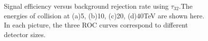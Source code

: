 \begin{figure}
\begin{center}
\end{center}
\caption{Signal efficiency versus background rejection rate using $\tau_{32}$.The energies of collision at (a)5, (b)10, (c)20, (d)40TeV are shown here. In each picture, the three ROC curves correspond to different detector sizes.}
\label{fig:cluster_tau32}
\end{figure}

